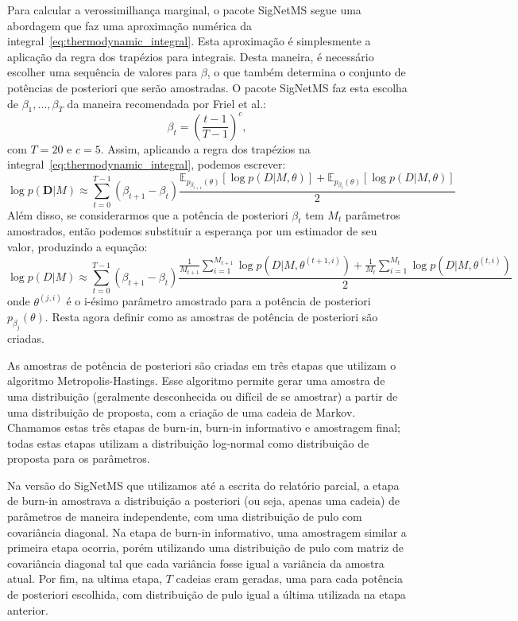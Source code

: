\documentclass[12pt]{article}
\newcommand{\expectation}{\mathbb{E}}
\begin{document}
Para calcular a verossimilhança marginal, o pacote SigNetMS segue uma 
abordagem que faz uma aproximação numérica da 
integral~\ref{eq:thermodynamic_integral}. Esta aproximação é 
simplesmente a aplicação da regra dos trapézios para integrais. Desta 
maneira, é necessário escolher uma sequência de valores para $\beta$, 
o que também determina o conjunto de potências de posteriori que serão 
amostradas. O pacote SigNetMS faz esta escolha de $\beta_1, \ldots, 
\beta_T$ da maneira recomendada por Friel et al.:
\begin{equation*}
    \beta_t = \left(\frac{t - 1}{T - 1}\right)^{c}, 
\end{equation*}
com $T = 20$ e $c = 5$. Assim, aplicando a regra dos trapézios na
integral~\ref{eq:thermodynamic_integral}, podemos escrever:
\begin{equation*}
    \log{p(\mathbf{D}| M)} \approx \sum_{t = 0}^{T - 1} 
        (\beta_{t + 1} - \beta_t)
    \frac{
    \expectation_{p_{\beta_{t + 1}} (\theta)}[\log p(D | M, \theta)]
+ 
    \expectation_{p_{\beta_{t}} (\theta)}[\log p(D | M, \theta)]}
{2}
\end{equation*}
Além disso, se considerarmos que a potência de posteriori $\beta_t$ tem
$M_t$ parâmetros amostrados, então podemos substituir a esperança por
um estimador de seu valor, produzindo a equação:
\begin{equation}
\log{p(D| M)} \approx \sum_{t = 0}^{T - 1} (\beta_{t + 1} - \beta_t)
\frac{
    \frac{1}{M_{t + 1}}
    \sum_{i = 1}^{M_{t + 1}}  \log p(D | M, \theta^{(t + 1, i)})
+ 
    \frac{1}{M_t}
    \sum_{i = 1}^{M_t}  \log p(D | M, \theta^{(t, i)})}
{2}
\end{equation}
onde $\theta^{(j, i)}$ é o i-ésimo parâmetro amostrado para a
potência de posteriori $p_{\beta_j}(\theta)$. Resta agora definir como
as amostras de potência de posteriori são criadas.

As amostras de potência de posteriori são criadas em três etapas que
utilizam o algoritmo Metropolis-Hastings. Esse algoritmo permite gerar
uma amostra de uma distribuição (geralmente desconhecida ou difícil de
se amostrar) a partir de uma distribuição de proposta, com a criação de
uma cadeia de Markov. Chamamos estas três etapas de burn-in, burn-in
informativo e amostragem final; todas estas etapas utilizam a
distribuição log-normal como distribuição de proposta para os 
parâmetros. 

Na versão do SigNetMS que utilizamos até a escrita do relatório parcial,
a etapa de burn-in amostrava a distribuição a posteriori (ou seja,
apenas uma cadeia) de parâmetros de maneira independente, com uma
distribuição de pulo com covariância diagonal. Na etapa de burn-in
informativo, uma amostragem similar a primeira etapa ocorria, porém
utilizando uma distribuição de pulo com matriz de covariância diagonal
tal que cada variância fosse igual a variância da amostra atual. Por
fim, na ultima etapa, $T$ cadeias eram geradas, uma para cada potência
de posteriori escolhida, com distribuição de pulo igual a última
utilizada na etapa anterior.
\end{document}
